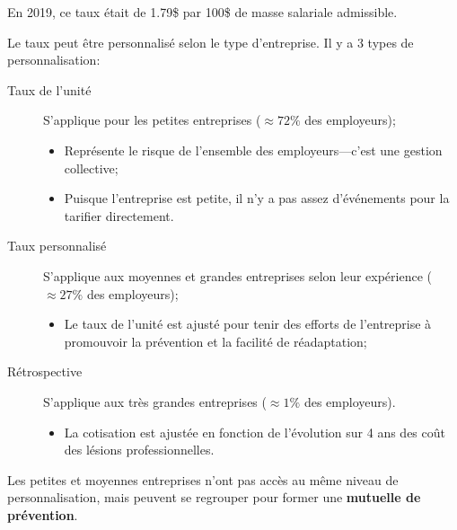 \documentclass[10pt, french]{article}
\begin{document}
\begin{multicols*}{3}
En 2019, ce taux était de 1.79\$ par 100\$ de masse salariale admissible.

Le taux peut être personnalisé selon le type d'entreprise. Il y a 3 types de personnalisation:
\begin{description}
	\item[Taux de l'unité]	S'applique pour les petites entreprises ($\approx 72\%$ des employeurs);
		\begin{itemize}[leftmargin = *]
		\item	Représente le risque de l'ensemble des employeurs---c'est une gestion collective;
		\item	Puisque l'entreprise est petite, il n'y a pas assez d'événements pour la tarifier directement.
		\end{itemize}
	\item[Taux personnalisé]	S'applique aux moyennes et grandes entreprises selon leur expérience ($\approx 27\%$ des employeurs); 
		\begin{itemize}[leftmargin = *]
		\item	Le taux de l'unité est ajusté pour tenir des efforts de l'entreprise à promouvoir la prévention et la facilité de réadaptation;
		\end{itemize}
	\item[Rétrospective]	S'applique aux très grandes entreprises ($\approx 1\%$ des employeurs).
		\begin{itemize}[leftmargin = *]
		\item	La cotisation est ajustée en fonction de l'évolution sur 4 ans des coût des lésions professionnelles.
		\end{itemize}
\end{description}

Les petites et moyennes entreprises n'ont pas accès au même niveau de personnalisation, mais peuvent se regrouper pour former une \textbf{mutuelle de prévention}.


\end{multicols*}
\end{document}
